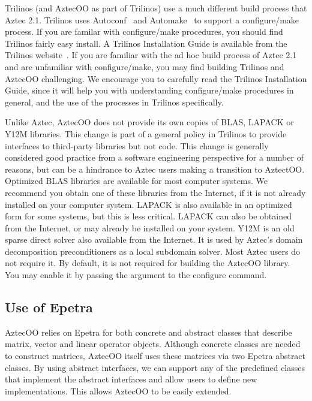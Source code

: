 \documentclass[12pt,relax]{AztecOOUserGuide}
\begin{document}
Trilinos (and AztecOO as part of Trilinos) use a much different build 
process that Aztec 2.1.  Trilinos uses 
Autoconf~\cite{Autoconf} and Automake~\cite{Automake} to support a configure/make
process.  If you are familar
with configure/make procedures, you should find Trilinos  fairly easy install.  
A Trilinos Installation Guide is available from
the Trilinos website~\cite{Trilinos-home-page}.  If you are familiar with the ad hoc
build process of Aztec 2.1 and are unfamiliar with configure/make, you may find 
building Trilinos and AztecOO challenging.  We encourage you to carefully read the 
Trilinos Installation Guide, since it will help you with understanding configure/make
procedures in general, and the use of the processes in Trilinos specifically.

Unlike Aztec, AztecOO does not provide its own copies of BLAS, LAPACK or Y12M libraries. 
This change is part of a general policy in Trilinos to provide interfaces to third-party
libraries but not code.  This change is generally considered good practice from a software
engineering perspective for a number of reasons, but can be a hindrance to Aztec users
making a transition to AztectOO.  Optimized BLAS libraries are available for most computer
systems.  We recommend you obtain one of these libraries from the Internet, if it is not
already installed on your computer system.  LAPACK is also available in an optimized form
for some systems, but this is less critical.  LAPACK can also be obtained from the Internet,
or may already be installed on your system.  Y12M is an old sparse direct solver also available
from the Internet.  It is used by Aztec's domain decomposition preconditioners as a local 
subdomain solver.  Most Aztec users do not require it.  By default, it is not required for
building the AztecOO library.  You may enable it by passing the argument 
 to the configure command.

\subsection{Use of Epetra}

AztecOO relies on Epetra for both concrete and abstract classes that
describe matrix, vector and linear operator objects.  
Although  concrete classes are needed to construct matrices, AztecOO
itself uses these matrices via two Epetra abstract classes.  By using
abstract interfaces, we can support any of the predefined classes that
implement the abstract interfaces and allow users to define
new implementations.  This allows AztecOO
to be easily extended.  
\end{document}
